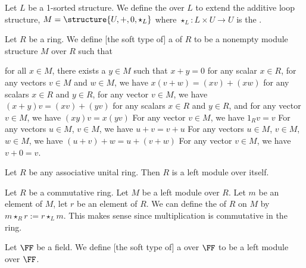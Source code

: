 \begin{definition}
Let $L$ be a 1-sorted structure.
We define the  over $L$ to extend the
additive loop structure, $M=\structure{U,+,0,\star_{L}}$ where
$\star_{L}\colon L\times U\to U$ is the .
\end{definition}

\begin{definition}
Let $R$ be a ring.
We define [the soft type of] a  of $R$ to be a
nonempty module structure $M$ over $R$ such that
\begin{itemize}
 for all $x\in M$, there exists a $y\in M$ such that $x+y=0$
 for any scalar
$x\in R$, for any vectors $v\in M$ and $w\in M$, we have $x(v+w)=(xv)+(xw)$
 for any scalars
$x\in R$ and $y\in R$, for any vector $v\in M$, we have $(x+y)v=(xv)+(yv)$
 for any scalars
$x\in R$ and $y\in R$, and for any vector $v\in M$, we have $(xy)v=x(yv)$
 For any vector $v\in M$, we have $1_{R}v=v$
 For any vectors
$u\in M$, $v\in M$, we have $u+v=v+u$
 For any vectors
$u\in M$, $v\in M$, $w\in M$, we have $(u+v)+w=u+(v+w)$
 For any vector $v\in M$,
we have $v+0=v$.
\end{itemize}
\end{definition}

\begin{example}
Let $R$ be any associative unital ring. Then $R$ is a left module over itself.
\end{example}

\begin{definition}
Let $R$ be a commutative ring. Let $M$ be a left module over $R$.
Let $m$ be an element of $M$, let $r$ be an element of $R$.
We can define the  of $R$ on $M$
by $m\star_{R}r := r\star_{L}m$. This makes sense since multiplication
is commutative in the ring.
\end{definition}

\begin{definition}
Let $\FF$ be a field. We define [the soft type of] a 
over $\FF$ to be a left module over $\FF$.
\end{definition}

